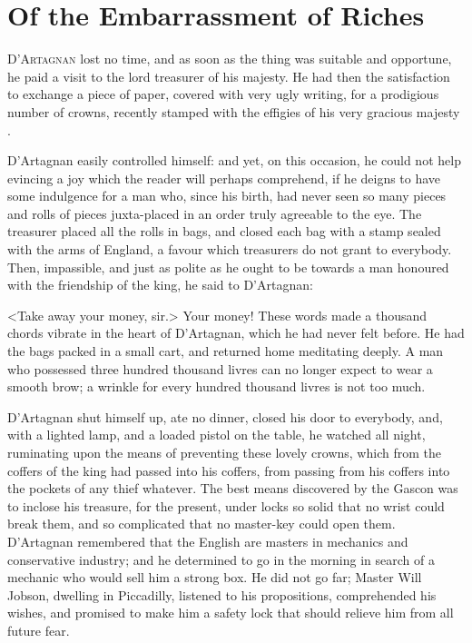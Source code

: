 \chapter{Of the Embarrassment of Riches}

\lettrine{D}{'Artagnan} lost no time, and as soon as the thing was suitable and opportune, he paid a visit to the lord treasurer of his majesty. He had then the satisfaction to exchange a piece of paper, covered with very ugly writing, for a prodigious number of crowns, recently stamped with the effigies of his very gracious majesty .

D'Artagnan easily controlled himself: and yet, on this occasion, he could not help evincing a joy which the reader will perhaps comprehend, if he deigns to have some indulgence for a man who, since his birth, had never seen so many pieces and rolls of pieces juxta-placed in an order truly agreeable to the eye. The treasurer placed all the rolls in bags, and closed each bag with a stamp sealed with the arms of England, a favour which treasurers do not grant to everybody. Then, impassible, and just as polite as he ought to be towards a man honoured with the friendship of the king, he said to D'Artagnan:

<Take away your money, sir.> Your money! These words made a thousand chords vibrate in the heart of D'Artagnan, which he had never felt before. He had the bags packed in a small cart, and returned home meditating deeply. A man who possessed three hundred thousand livres can no longer expect to wear a smooth brow; a wrinkle for every hundred thousand livres is not too much.

D'Artagnan shut himself up, ate no dinner, closed his door to everybody, and, with a lighted lamp, and a loaded pistol on the table, he watched all night, ruminating upon the means of preventing these lovely crowns, which from the coffers of the king had passed into his coffers, from passing from his coffers into the pockets of any thief whatever. The best means discovered by the Gascon was to inclose his treasure, for the present, under locks so solid that no wrist could break them, and so complicated that no master-key could open them. D'Artagnan remembered that the English are masters in mechanics and conservative industry; and he determined to go in the morning in search of a mechanic who would sell him a strong box. He did not go far; Master Will Jobson, dwelling in Piccadilly, listened to his propositions, comprehended his wishes, and promised to make him a safety lock that should relieve him from all future fear.

